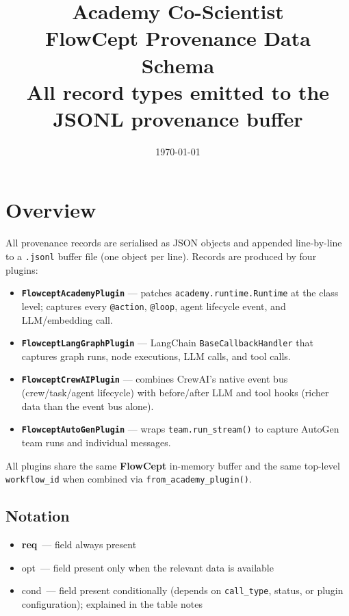 \documentclass[11pt,a4paper]{article}
\title{\textbf{Academy Co-Scientist}\\[0.4em]
       \large FlowCept Provenance Data Schema\\[0.2em]
       \normalsize All record types emitted to the JSONL provenance buffer}
\author{}
\date{\today}
\newcommand{\opt}{\textcolor{optred}{opt}}
\newcommand{\cond}{\textcolor{condorange}{cond}}
\newcommand{\req}{\textbf{req}}
\begin{document}
\maketitle
\thispagestyle{fancy}
\tableofcontents
\newpage

\section{Overview}

All provenance records are serialised as JSON objects and appended line-by-line
to a \texttt{.jsonl} buffer file (one object per line).
Records are produced by four plugins:

\begin{itemize}[itemsep=2pt]
  \item \textbf{\texttt{FlowceptAcademyPlugin}} — patches \texttt{academy.runtime.Runtime}
        at the class level; captures every \texttt{@action}, \texttt{@loop},
        agent lifecycle event, and LLM/embedding call.
  \item \textbf{\texttt{FlowceptLangGraphPlugin}} — LangChain
        \texttt{BaseCallbackHandler} that captures graph runs, node executions,
        LLM calls, and tool calls.
  \item \textbf{\texttt{FlowceptCrewAIPlugin}} — combines CrewAI's native event
        bus (crew/task/agent lifecycle) with before/after LLM and tool hooks
        (richer data than the event bus alone).
  \item \textbf{\texttt{FlowceptAutoGenPlugin}} — wraps \texttt{team.run\_stream()}
        to capture AutoGen team runs and individual messages.
\end{itemize}

All plugins share the same \textbf{FlowCept} in-memory buffer and the same
top-level \texttt{workflow\_id} when combined via \texttt{from\_academy\_plugin()}.

\subsection*{Notation}
\begin{itemize}[itemsep=2pt]
  \item \req\ — field always present
  \item \opt\ — field present only when the relevant data is available
  \item \cond\ — field present conditionally (depends on \texttt{call\_type},
        status, or plugin configuration); explained in the table notes
\end{itemize}
\end{document}
